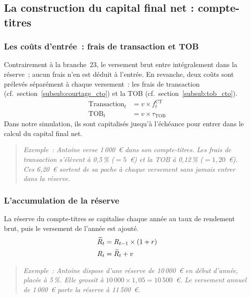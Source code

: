 ﻿\documentclass[12pt, a4paper]{article}
\begin{document}
\subsection{La construction du capital final net : compte-titres}

\subsubsection*{Les coûts d'entrée~: frais de transaction et TOB}
\label{sub:couts_entree_ct}

Contrairement à la branche~23, le versement brut entre intégralement dans
la réserve~; aucun frais n'en est déduit à l'entrée. En revanche, deux coûts
sont prélevés séparément à chaque versement~: les frais de transaction (cf.~section~\ref{subsub:courtage_cto}) et la TOB
(cf.~section~\ref{subsub:tob_cto}).
\begin{align}
  \text{Transaction}_t &= v \times f_t^{\text{CT}} \\
  \text{TOB}_t      &= v \times \tau_{\text{TOB}}
\end{align}
Dans notre simulation, ils sont
capitalisés jusqu'à l'échéance pour entrer dans le calcul du capital final net.

\begin{quote}
\textit{Exemple~: Antoine verse 1\,000~€ dans son compte-titres. Les frais de
transaction s'élèvent à 0{,}5\,\% ($= 5$~€) et la TOB à 0{,}12\,\% ($= 1{,}20$~€).
Ces 6{,}20~€ sortent de sa poche à chaque versement sans jamais entrer dans la
réserve.}
\end{quote}

\subsubsection*{L'accumulation de la réserve}
\label{sub:accumulation_ct}

La réserve du compte-titres se capitalise chaque année au taux de rendement
brut, puis le versement de l'année est ajouté.
\begin{align}
  \widetilde{R}_t &= R_{t-1} \times (1 + r) \notag \\
  R_t             &= \widetilde{R}_t + v
\end{align}

\begin{quote}
\textit{Exemple~: Antoine dispose d'une réserve de 10\,000~€ en début d'année,
placée à 5\,\%. Elle grossit à $10\,000 \times 1{,}05 = 10\,500$~€. Le versement
annuel de 1\,000~€ porte la réserve à 11\,500~€.}
\end{quote}
\end{document}
